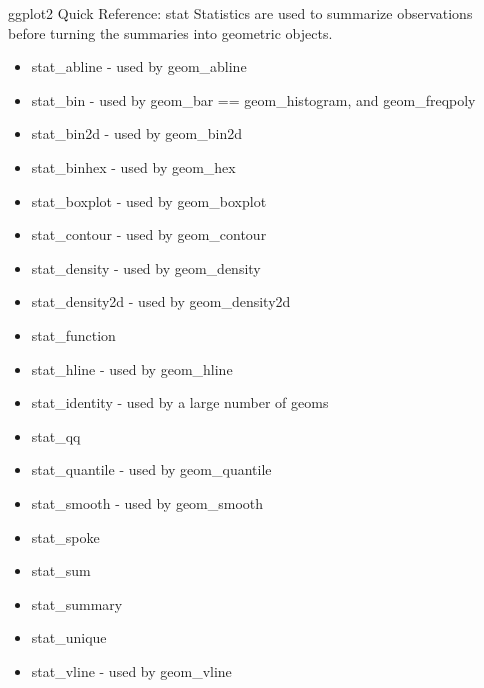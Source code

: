 ggplot2 Quick Reference: stat
Statistics are used to summarize observations before turning the summaries into geometric objects.

\begin{itemize}
\item stat_abline - used by geom_abline
\item stat_bin - used by geom_bar == geom_histogram, and geom_freqpoly
\item stat_bin2d - used by geom_bin2d
\item stat_binhex - used by geom_hex
\item stat_boxplot - used by geom_boxplot
\item stat_contour - used by geom_contour
\item stat_density - used by geom_density
\item stat_density2d - used by geom_density2d
\item stat_function
\item stat_hline - used by geom_hline
\item stat_identity - used by a large number of geoms
\item stat_qq
\item stat_quantile - used by geom_quantile
\item stat_smooth - used by geom_smooth
\item stat_spoke
\item stat_sum
\item stat_summary
\item stat_unique
\item stat_vline - used by geom_vline
\end{itemize}
